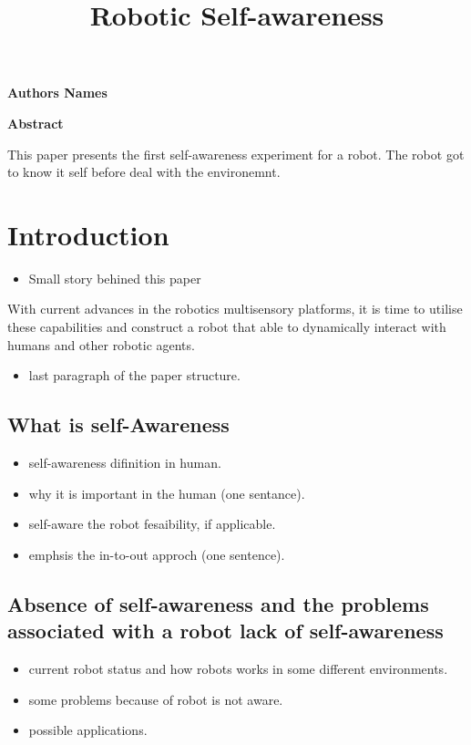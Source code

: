 \documentclass[12pt]{article}
\begin{document}
\title{Robotic Self-awareness}
\maketitle

\begin{center}
    \vspace{0.4cm}
    \textbf{Authors Names}
    
    \vspace{0.9cm}
    \textbf{Abstract}
\end{center}
This paper presents the first self-awareness experiment for a robot. The robot got to know it self before deal with the environemnt. 
\pagebreak

\section{Introduction}
\begin{itemize}
\item Small story behined this paper
\end{itemize}
With current advances in the robotics multisensory platforms, it is time to utilise these capabilities and construct a robot that able to dynamically interact with humans and other robotic agents.
\begin{itemize}
\item last paragraph of the paper structure.
\end{itemize}
\subsection{What is self-Awareness}
\begin{itemize}
\item self-awareness difinition in human.
\item why it is important in the human (one sentance).
\item self-aware the robot fesaibility, if applicable.
\item emphsis the in-to-out approch (one sentence).
\end{itemize}
\subsection{Absence of self-awareness and the problems associated with a robot lack of self-awareness}
\begin{itemize}
\item current robot status and how robots works in some different environments.
\item some problems because of robot is not aware.
\item possible applications.
\end{itemize}
\end{document}
